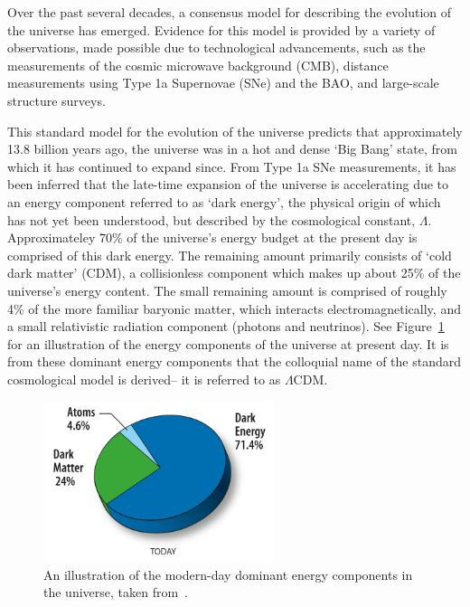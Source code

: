 Over the past several decades, a consensus model for describing the evolution of the universe has emerged.  Evidence for this model is provided by a variety of observations, made possible due to technological advancements, such as the measurements of the cosmic microwave background (CMB), distance measurements using Type 1a Supernovae (SNe) and the BAO, and large-scale structure surveys. 

This standard model for the evolution of the universe predicts that approximately 13.8 billion years ago, the universe was in a hot and dense `Big Bang' state, from which it has continued to expand since. From Type 1a SNe measurements, it has been inferred that the late-time expansion of the universe is accelerating due to an energy component referred to as `dark energy', the physical origin of which has not yet been understood, but described by the cosmological constant, $\Lambda$. Approximateley 70\% of the universe's energy budget at the present day is comprised of this dark energy. The remaining amount primarily consists of `cold dark matter' (CDM), a collisionless component which makes up about 25\% of the universe's energy content. The small remaining amount is comprised of roughly 4\% of the more familiar baryonic matter, which interacts electromagnetically, and a small relativistic radiation component (photons and neutrinos). See Figure~\ref{fig:contentuniverse} for an illustration of the energy components of the universe at present day. It is from these dominant energy components that the colloquial name of the standard cosmological model is derived-- it is referred to as $\Lambda$CDM.
\begin{figure}[ht]
	\centering
	\includegraphics[width=0.6\textwidth]{fig/placeholer_energycontent_wmap.png}
	\caption{An illustration of the modern-day dominant energy components in the universe, taken from~\cite{NASAWMAP:2014ec}.}
	\label{fig:contentuniverse}
\end{figure}

